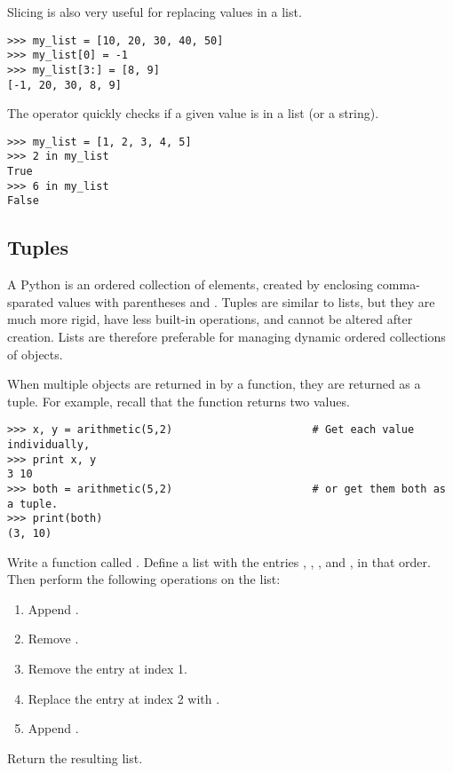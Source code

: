 Slicing is also very useful for replacing values in a list.

\begin{lstlisting}
>>> my_list = [10, 20, 30, 40, 50]
>>> my_list[0] = -1
>>> my_list[3:] = [8, 9]
[-1, 20, 30, 8, 9]
\end{lstlisting}

The  operator quickly checks if a given value is in a list (or a string).

\begin{lstlisting}
>>> my_list = [1, 2, 3, 4, 5]
>>> 2 in my_list
True
>>> 6 in my_list
False
\end{lstlisting}

\subsection*{Tuples} %

A Python  is an ordered collection of elements, created by enclosing comma-sparated values with parentheses \li{(} and \li{)}.
Tuples are similar to lists, but they are much more rigid, have less built-in operations, and cannot be altered after creation.
Lists are therefore preferable for managing dynamic ordered collections of objects.

When multiple objects are returned in by a function, they are returned as a tuple.
For example, recall that the  function returns two values.

\begin{lstlisting}
>>> x, y = arithmetic(5,2)                      # Get each value individually,
>>> print x, y
3 10
>>> both = arithmetic(5,2)                      # or get them both as a tuple.
>>> print(both)
(3, 10)
\end{lstlisting}

\begin{problem} %
Write a function called .
Define a list with the entries , , , and , in that order.
Then perform the following operations on the list:
\begin{enumerate}
\item Append .
\item Remove .
\item Remove the entry at index 1.
\item Replace the entry at index 2 with .
\item Append .
\end{enumerate}
Return the resulting list.
\end{problem}

